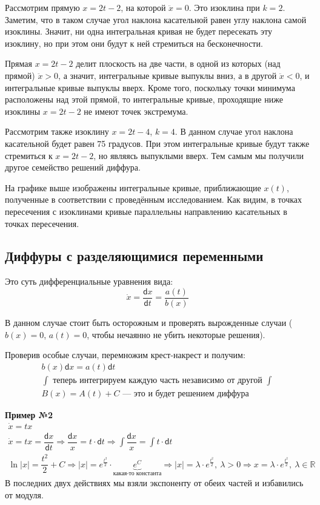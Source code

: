 \documentclass[a4paper,12pt]{article}
\newcommand{\R}{\mathbb{R}}
\renewcommand{\d}{\mathsf{d}}
\newcommand{\dx}{\dot{x}}
\newcommand{\ddx}{\ddot{x}}
\newcommand{\ds}{\displaystyle}
\begin{document}
Рассмотрим прямую $x = 2t - 2$, на которой $\ddx = 0$. Это изоклина при $k = 2$. Заметим, что в таком случае угол наклона касательной равен углу наклона самой изоклины. Значит, ни одна интегральная кривая не будет пересекать эту изоклину, но при этом они будут к ней стремиться на бесконечности.

Прямая $x = 2t - 2$ делит плоскость на две части, в одной из которых (над прямой) $\ddx > 0$, а значит, интегральные кривые выпуклы вниз, а в другой $\ddx < 0$, и интегральные кривые выпуклы вверх. Кроме того, поскольку точки минимума расположены над этой прямой, то интегральные кривые, проходящие ниже изоклины $x = 2t - 2$ не имеют точек экстремума. 

Рассмотрим также изоклину $x = 2t - 4$, $ k = 4$. В данном случае угол наклона касательной будет равен 75 градусов. При этом интегральные кривые будут также стремиться к $x = 2t - 2$, но являясь выпуклыми вверх. Тем самым мы получили другое семейство решений диффура.

На графике выше изображены интегральные кривые, приближающие $x(t)$, полученные в соответствии с проведённым исследованием. Как видим, в точках пересечения с изоклинами кривые параллельны направлению касательных в точках пересечения.


\subsection{Диффуры с разделяющимися переменными}

Это суть дифференциальные уравнения вида:
\[\dx = \dfrac{\d x}{\d t} = \dfrac{a(t)}{b(x)}\]

В данном случае стоит быть осторожным и проверять вырожденные случаи ($b(x) = 0$, $a(t) = 0$, чтобы нечаянно не убить некоторые решения).

Проверив особые случаи, перемножим крест-накрест и получим:
\begin{gather*}
	b(x)\d x = a(t)\d t \\
	\ds\int \text{ теперь интегрируем каждую часть независимо от другой } \ds\int\\
	B(x) = A(t) + C \text{ --- это и будет решением диффура}
\end{gather*}

\textbf{Пример №2}
\begin{gather*}
	\dx = tx \\
	\dx= tx = \dfrac{\d x}{\d t} \Longrightarrow \dfrac{\d x}{x} = t \cdot \d t \Longrightarrow \ds \int\dfrac{\d x}{x}=\int t \cdot \d t \\
	\ln |x| = \dfrac{t^2}{2} + C \Longrightarrow |x| = e^{\frac{t^2}{2}} \cdot \underbrace{e^C}_{\text{какая-то константа}} \Longrightarrow |x| = \lambda \cdot e^{\frac{t^2}{2}},\ \lambda > 0 \Longrightarrow x = \lambda \cdot e^{\frac{t^2}{2}},\ \lambda \in \R
\end{gather*}
В последних двух действиях мы взяли экспоненту от обеих частей и избавились от модуля.
\end{document}
